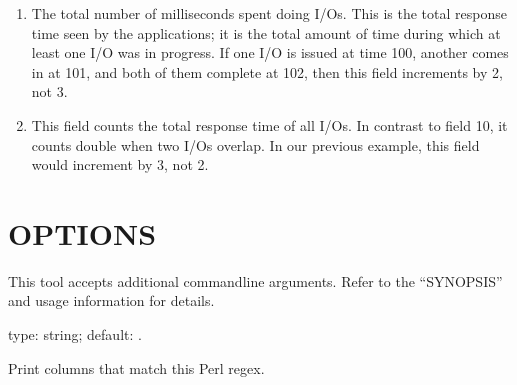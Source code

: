 \documentclass[letterpaper,10pt,english]{sphinxmanual}
\begin{document}
\begin{enumerate}
\item {} 
The total number of milliseconds spent doing I/Os.  This is  the total
response time seen by the applications; it is the total amount of time during
which at least one I/O was in progress.  If one I/O is issued at time 100,
another comes in at 101, and both of them complete at 102, then this field
increments by 2, not 3.

\item {} 
This field counts the total response time of all I/Os.  In contrast to field 10,
it counts double when two I/Os overlap.  In our previous example, this field
would increment by 3, not 2.

\end{enumerate}


\section{OPTIONS}
\label{\detokenize{mariadb-iostat:options}}
This tool accepts additional command\sphinxhyphen{}line arguments.  Refer to the
“SYNOPSIS” and usage information for details.

\begin{fulllineitems}
\label{\detokenize{mariadb-iostat:cmdoption-mariadb-iostat-columns-regex}}
type: string; default: .

Print columns that match this Perl regex.

\end{fulllineitems}

\end{document}
